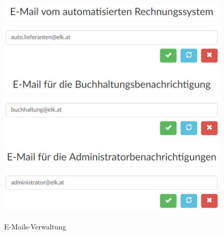 \begin{figure}[!h]
    \centering
    \includegraphics[width=15cm]{figures/emails.png}
    \label{fig:emailsverwaltung}
    \caption{E-Mails-Verwaltung}
\end{figure}